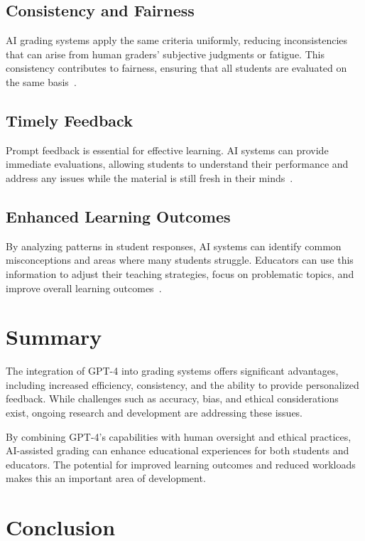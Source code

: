 \documentclass[ms,twoside,print]{nuthesis}
\begin{document}
\subsection{Consistency and Fairness}

AI grading systems apply the same criteria uniformly, reducing inconsistencies that can arise from human graders' subjective judgments or fatigue. This consistency contributes to fairness, ensuring that all students are evaluated on the same basis~\cite{Konnecke2020}.

\subsection{Timely Feedback}

Prompt feedback is essential for effective learning. AI systems can provide immediate evaluations, allowing students to understand their performance and address any issues while the material is still fresh in their minds~\cite{Nicol2006}.

\subsection{Enhanced Learning Outcomes}

By analyzing patterns in student responses, AI systems can identify common misconceptions and areas where many students struggle. Educators can use this information to adjust their teaching strategies, focus on problematic topics, and improve overall learning outcomes~\cite{Zawacki2021}.

\section{Summary}

The integration of GPT-4 into grading systems offers significant advantages, including increased efficiency, consistency, and the ability to provide personalized feedback. While challenges such as accuracy, bias, and ethical considerations exist, ongoing research and development are addressing these issues.

By combining GPT-4's capabilities with human oversight and ethical practices, AI-assisted grading can enhance educational experiences for both students and educators. The potential for improved learning outcomes and reduced workloads makes this an important area of development.

\section{Conclusion}
\end{document}
